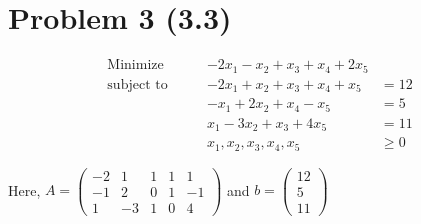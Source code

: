 \documentclass[12pt]{article}
\begin{document}
\section*{Problem 3 (3.3)}

$$
\begin{aligned}
\text{Minimize} \qquad & -2x_1 - x_2 + x_3 + x_4 + 2x_5 &  \\
\text{subject\  to} \qquad & -2x_1 + x_2 + x_3 + x_4 + x_5 & = 12\\
 & -x_1 + 2x_2 + x_4 - x_5 & = 5 \\
 & x_1 - 3x_2 + x_3 + 4x_5 & = 11 \\
 & x_1, x_2, x_3, x_4, x_5 & \geqslant 0
\end{aligned}
$$

Here, $A = \begin{pmatrix}
-2 & 1 & 1 & 1 & 1 \\
-1 & 2 & 0 & 1 & -1 \\
1 & -3 & 1 & 0 & 4 
\end{pmatrix}$ and $b = \begin{pmatrix}
12 \\ 
5 \\
11
\end{pmatrix}$
\end{document}
